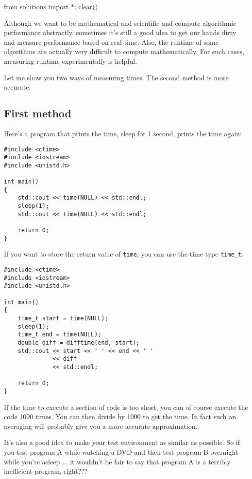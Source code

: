 \begin{python0}
from solutions import *; clear()
\end{python0}


Although we want to be mathematical and scientific and
compute algorithmic
performance abstractly, sometimes it's still a good idea to
get our hands dirty and measure performance based on real time.
Also, the runtime of some algorithms are actually very difficult to compute
mathematically.
For such cases, measuring runtime experimentally is helpful.

Let me show you two ways of measuring times.
The second method is more accurate.


\subsection{First method}

Here's a program that prints the time, sleep for 1 second, prints the time
again:
\begin{Verbatim}[frame=single,fontsize=\footnotesize]
#include <ctime>
#include <iostream> 
#include <unistd.h>
  
int main()
{
    std::cout << time(NULL) << std::endl;
    sleep(1);
    std::cout << time(NULL) << std::endl;

    return 0;
}
\end{Verbatim}
If you want to store the return value of \verb!time!, you can use
the time type \verb!time_t!:
\begin{Verbatim}[frame=single,fontsize=\footnotesize]
#include <ctime>
#include <iostream>
#include <unistd.h>
  
int main()
{
    time_t start = time(NULL);
    sleep(1);
    time_t end = time(NULL);
    double diff = difftime(end, start);
    std::cout << start << ' ' << end << ' ' 
              << diff
              << std::endl;

    return 0;
}
\end{Verbatim}

If the time to execute a section of code is too short, you can 
of course execute the code 1000 times.
You can then divide by 1000 to get the time.
In fact such an averaging will probably give you a more accurate
approximation.

It's also a good idea to make your test environment as similar as possible.
So if you test program A while watching a DVD and then test 
program B overnight while
you're asleep ... it wouldn't be fair to say that program A is a terribly
inefficient program, right???

